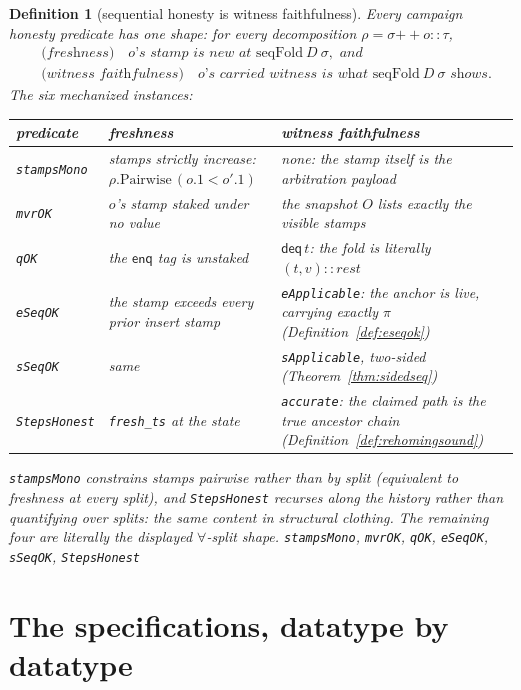 \documentclass[11pt]{article}
\newtheorem{definition}[theorem]{Definition}
\newcommand{\lean}[1]{\texttt{#1}}
\newcommand{\enq}{\mathsf{enq}}
\newcommand{\deq}{\mathsf{deq}}
\begin{document}
\begin{definition}[sequential honesty is witness faithfulness]
\label{def:witnesshon}
Every campaign honesty predicate has one shape: for every
decomposition $\rho = \sigma \mathbin{+\!\!+} o :: \tau$,
\[
\begin{aligned}
  &\textit{(freshness)} \quad
    o\textit{'s stamp is new at } \mathrm{seqFold}\ D\ \sigma
    , \textit{ and} \\
  &\textit{(witness faithfulness)} \quad
    o\textit{'s carried witness is what }
    \mathrm{seqFold}\ D\ \sigma \textit{ shows} .
\end{aligned}
\]
The six mechanized instances:
\begin{center}\small
\begin{tabular}{@{}lp{4.1cm}p{5.6cm}@{}}
\toprule
predicate & freshness & witness faithfulness \\
\midrule
\lean{stampsMono} & stamps strictly increase:
  $\rho.\mathrm{Pairwise}\,(o.1 < o'.1)$ &
  none: the stamp itself is the arbitration payload \\
\lean{mvrOK} & $o$'s stamp staked under no value &
  the snapshot $O$ lists exactly the visible stamps \\
\lean{qOK} & the $\enq$ tag is unstaked &
  $\deq\,t$: the fold is literally $(t, v) :: \mathit{rest}$ \\
\lean{eSeqOK} & the stamp exceeds every prior insert stamp &
  \lean{eApplicable}: the anchor is live, carrying exactly $\pi$
  (Definition~\ref{def:eseqok}) \\
\lean{sSeqOK} & same & \lean{sApplicable}, two-sided
  (Theorem~\ref{thm:sidedseq}) \\
\lean{StepsHonest} & \lean{fresh\_ts} at the state &
  \lean{accurate}: the claimed path is the true ancestor chain
  (Definition~\ref{def:rehomingsound}) \\
\bottomrule
\end{tabular}
\end{center}
\lean{stampsMono} constrains stamps pairwise rather than by split
(equivalent to freshness at every split), and \lean{StepsHonest}
recurses along the history rather than quantifying over splits: the
same content in structural clothing. The remaining four are literally
the displayed $\forall$-split shape.
\hfill\lean{stampsMono}, \lean{mvrOK}, \lean{qOK}, \lean{eSeqOK},
\lean{sSeqOK}, \lean{StepsHonest}
\end{definition}

\section{The specifications, datatype by datatype}
\label{sec:specs}
\end{document}

